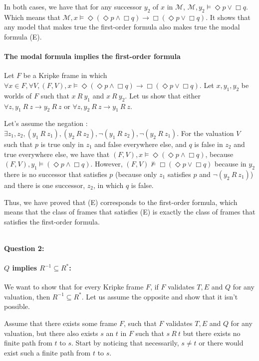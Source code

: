 \documentclass[10pt]{article}
\def\question#1{\ \vspace{1cm}\\\textbf{Question #1:}\quad}
\def\M{\mathcal{M}}
\begin{document}
In both cases, we have that for any successor $y_2$ of $x$ in $\M$, $\M,y_2\models\Diamond p\vee\Box q$. Which means that $\M,x\models\Diamond(\Diamond p\wedge\Box q)\rightarrow\Box(\Diamond p\vee\Box q)$. It shows that any model that makes true the first-order formula also makes true the modal formula (E).

 
\paragraph{The modal formula implies the first-order formula}
Let $F$ be a Kripke frame in which $\forall x\in F,\forall V, (F,V),x\models\Diamond(\Diamond p\wedge\Box q)\rightarrow\Box(\Diamond p\vee\Box q)$. Let $x,y_1,y_2$ be worlds of $F$ such that $x\ R\ y_1$ and $x\ R\ y_2$. Let us show that either $\forall z, y_1\ R\ z\rightarrow y_2\ R\ z$ or $\forall z, y_2\ R\ z\rightarrow y_1\ R\ z$.

Let's assume the negation : $\exists z_1,z_2, (y_1\ R\ z_1), (y_2\ R\ z_2), \neg(y_1\ R\ z_2), \neg(y_2\ R\ z_1)$. For the valuation $V$ such that $p$ is true only in $z_1$ and false everywhere else, and $q$ is false in $z_2$ and true everywhere else, we have that $(F,V),x\models\Diamond(\Diamond p\wedge\Box q)$, because $(F,V),y_1\models(\Diamond p\wedge\Box q)$. However, $(F,V)\not\models\Box(\Diamond p\vee\Box q)$ because in $y_2$ there is no successor that satisfies $p$ (because only $z_1$ satisfies $p$ and $\neg(y_2\ R\ z_1)$) and there is one successor, $z_2$, in which $q$ is false.

Thus, we have proved that (E) corresponds to the first-order formula, which means that the class of frames that satisfies (E) is exactly the class of frames that satisfies the first-order formula.

\question{2}

\paragraph{$Q$ implies $R^{-1}\subseteq R^*$:}
We want to show that for every Kripke frame $F$, if $F$ validates $T,E$ and $Q$ for any valuation, then $R^{-1}\subseteq R^*$. Let us assume the opposite and show that it isn't possible.

Assume that there exists some frame $F$, such that $F$ validates $T,E$ and $Q$ for any valuation, but there also exists $s$ an $t$ in $F$ such that $s\ R\ t$ but there exists no finite path from $t$ to $s$.
Start by noticing that necessarily, $s\neq t$ or there would exist such a finite path from $t$ to $s$.
\end{document}
